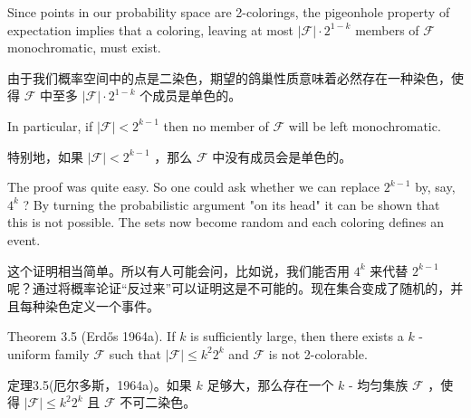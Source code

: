 \documentclass[10pt]{article}
\begin{document}
Since points in our probability space are 2-colorings, the pigeonhole property of expectation implies that a coloring, leaving at most \(\left| \mathcal{F}\right|  \cdot  {2}^{1 - k}\) members of \(\mathcal{F}\) monochromatic, must exist.

\begin{tcolorbox}\relax
由于我们概率空间中的点是二染色，期望的鸽巢性质意味着必然存在一种染色，使得 \(\mathcal{F}\) 中至多 \(\left| \mathcal{F}\right|  \cdot  {2}^{1 - k}\) 个成员是单色的。
\end{tcolorbox}

In particular, if \(\left| \mathcal{F}\right|  < {2}^{k - 1}\) then no member of \(\mathcal{F}\) will be left monochromatic.

\begin{tcolorbox}\relax
特别地，如果 \(\left| \mathcal{F}\right|  < {2}^{k - 1}\) ，那么 \(\mathcal{F}\) 中没有成员会是单色的。
\end{tcolorbox}

The proof was quite easy. So one could ask whether we can replace \({2}^{k - 1}\) by, say, \({4}^{k}\) ? By turning the probabilistic argument "on its head" it can be shown that this is not possible. The sets now become random and each coloring defines an event.

\begin{tcolorbox}\relax
这个证明相当简单。所以有人可能会问，比如说，我们能否用 \({4}^{k}\) 来代替 \({2}^{k - 1}\) 呢？通过将概率论证“反过来”可以证明这是不可能的。现在集合变成了随机的，并且每种染色定义一个事件。
\end{tcolorbox}

Theorem 3.5 (Erdős 1964a). If \(k\) is sufficiently large, then there exists a \(k\) -uniform family \(\mathcal{F}\) such that \(\left| \mathcal{F}\right|  \leq  {k}^{2}{2}^{k}\) and \(\mathcal{F}\) is not 2-colorable.

\begin{tcolorbox}\relax
定理3.5(厄尔多斯，1964a)。如果 \(k\) 足够大，那么存在一个 \(k\) - 均匀集族 \(\mathcal{F}\) ，使得 \(\left| \mathcal{F}\right|  \leq  {k}^{2}{2}^{k}\) 且 \(\mathcal{F}\) 不可二染色。
\end{tcolorbox}
\end{document}

